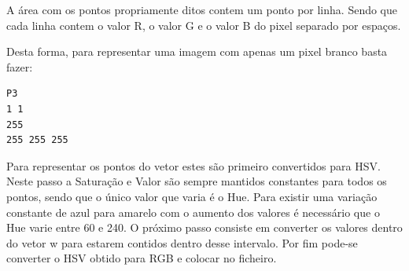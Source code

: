 \documentclass[a4paper]{report}
\begin{document}
A área com os pontos propriamente ditos contem um ponto por linha. Sendo que
cada linha contem o valor R, o valor G e o valor B do pixel separado por espaços.

Desta forma, para representar uma imagem com apenas um pixel branco basta fazer:
\begin{verbatim}
P3
1 1
255
255 255 255
\end{verbatim}

Para representar os pontos do vetor estes são primeiro convertidos para HSV.
Neste passo a Saturação e Valor são sempre mantidos constantes para todos os
pontos, sendo que o único valor que varia é o Hue. Para existir uma variação
constante de azul para amarelo com o aumento dos valores é necessário que o Hue
varie entre 60 e 240. O próximo passo consiste em converter os valores dentro do
vetor w para estarem contidos dentro desse intervalo. Por fim pode-se converter
o HSV obtido para RGB e colocar no ficheiro.
\end{document}
